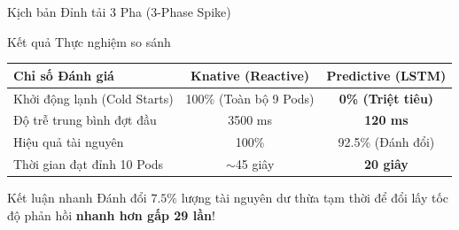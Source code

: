 \documentclass[10pt, aspectratio=169]{beamer}
\begin{document}
\begin{frame}{Kịch bản Đỉnh tải 3 Pha (3-Phase Spike)}
    \begin{center}
    \end{center}
\end{frame}

\begin{frame}{Kết quả Thực nghiệm so sánh}
    \begin{table}
        \centering
        \begin{tabular}{lcc}
            \toprule
            \textbf{Chỉ số Đánh giá} & \textbf{Knative (Reactive)} & \textbf{Predictive (LSTM)} \\
            \midrule
            Khởi động lạnh (Cold Starts) & 100\% (Toàn bộ 9 Pods) & \textbf{\alert{0\% (Triệt tiêu)}} \pause \\
            Độ trễ trung bình đợt đầu & 3500 ms & \textbf{\alert{120 ms}} \pause \\
            Hiệu quả tài nguyên & 100\% & 92.5\% (Đánh đổi) \pause \\
            Thời gian đạt đỉnh 10 Pods & $\sim$45 giây & \textbf{20 giây} \\
            \bottomrule
        \end{tabular}
    \end{table}
    \pause
    \vspace{0.5cm}
    \begin{alertblock}{Kết luận nhanh}
        Đánh đổi $7.5\%$ lượng tài nguyên dư thừa tạm thời để đổi lấy tốc độ phản hồi \textbf{nhanh hơn gấp 29 lần}!
    \end{alertblock}
\end{frame}
\end{document}
